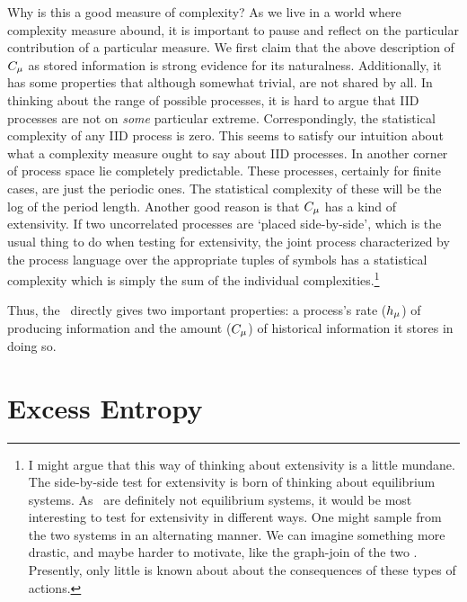Why is this a good measure of complexity? As we live in a world where complexity measure abound, it is important to pause and reflect on the particular contribution of a particular measure. We first claim that the above description of $C_\mu$ as stored information is strong evidence for its naturalness. Additionally, it has some properties that although somewhat trivial, are not shared by all. In thinking about the range of possible processes, it is hard to argue that IID processes are not on \emph{some} particular extreme. Correspondingly, the statistical complexity of any IID process is zero. This seems to satisfy our intuition about what a complexity measure ought to say about IID processes. In another corner of process space lie completely predictable. These processes, certainly for finite cases, are just the periodic ones. The statistical complexity of these will be the log of the period length. Another good reason is that $C_\mu$ has a kind of extensivity. If two uncorrelated processes are `placed side-by-side', which is the usual thing to do when testing for extensivity, the joint process characterized by the process language over the appropriate tuples of symbols has a statistical complexity which is simply the sum of the individual complexities.\footnote{I might argue that this way of thinking about extensivity is a little mundane. The side-by-side test for extensivity is born of thinking about equilibrium systems. As \eMs\ are definitely not equilibrium systems, it would be most interesting to test for extensivity in different ways. One might sample from the two systems in an alternating manner. We can imagine something more drastic, and maybe harder to motivate, like the graph-join of the two \eMs. Presently, only little is known about about the consequences of these types of actions.}

Thus, the \eM\  directly gives two important properties: a process's rate
($h_\mu$) of producing information and the amount ($C_\mu$) of historical
information it stores in doing so.

\section{Excess Entropy}

